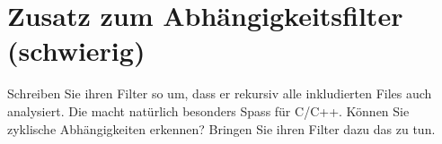 \documentclass[a4paper,11pt,oneside]{scrbook}
\begin{document}
\section{Zusatz zum Abhängigkeitsfilter (schwierig)} %
\label{sec:Zusatz zum Abhängigkeitsfilter}
Schreiben Sie ihren Filter so um, dass er rekursiv alle inkludierten Files auch analysiert. Die macht natürlich besonders Spass für C/C++.
Können Sie zyklische Abhängigkeiten erkennen? Bringen Sie ihren Filter dazu das zu tun.


\end{document}
